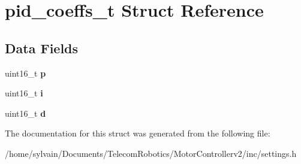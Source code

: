 \hypertarget{structpid__coeffs__t}{}\section{pid\+\_\+coeffs\+\_\+t Struct Reference}
\label{structpid__coeffs__t}
\subsection*{Data Fields}
\begin{DoxyCompactItemize}
\item 
\hypertarget{structpid__coeffs__t_acb4cbe9b58ef221c658d478f121f490f}{}\label{structpid__coeffs__t_acb4cbe9b58ef221c658d478f121f490f} 
uint16\+\_\+t {\bfseries p}
\item 
\hypertarget{structpid__coeffs__t_a4f15c52b8bd45a54127b764e57d0fdc0}{}\label{structpid__coeffs__t_a4f15c52b8bd45a54127b764e57d0fdc0} 
uint16\+\_\+t {\bfseries i}
\item 
\hypertarget{structpid__coeffs__t_a07e99df50087649204a49b12a1989461}{}\label{structpid__coeffs__t_a07e99df50087649204a49b12a1989461} 
uint16\+\_\+t {\bfseries d}
\end{DoxyCompactItemize}


The documentation for this struct was generated from the following file\+:\begin{DoxyCompactItemize}
\item 
/home/sylvain/\+Documents/\+Telecom\+Robotics/\+Motor\+Controllerv2/inc/settings.\+h\end{DoxyCompactItemize}
